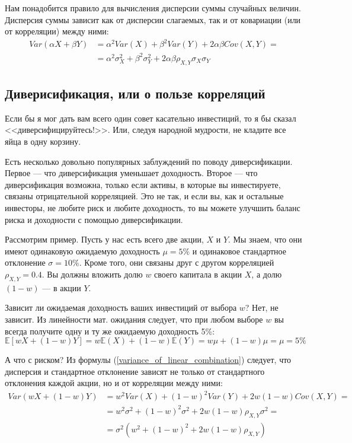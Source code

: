 Нам понадобится правило для вычисления дисперсии суммы случайных величин. Дисперсия суммы зависит как от дисперсии слагаемых, так и от ковариации (или от корреляции) между ними:
\begin{align}
Var(\alpha X + \beta Y) &= \alpha^2 Var(X) + \beta^2 Var(Y) + 2 \alpha \beta Cov(X, Y) = \nonumber \\
&= \alpha^2\sigma_X^2 + \beta^2 \sigma_Y^2 + 2\alpha\beta\rho_{X,Y}\sigma_X\sigma_Y
\label{variance_of_linear_combination}
\end{align}

\subsection{Диверисификация, или о пользе корреляций}

Если бы я мог дать вам всего один совет касательно инвестиций, то я бы сказал <<диверсифицируйтесь!>>. Или, следуя народной мудрости, не кладите все яйца в одну корзину. 

Есть несколько довольно популярных заблуждений по поводу диверсификации. Первое --- что диверсификация уменьшает доходность. Второе --- что диверсификация возможна, только если активы, в которые вы инвестируете, связаны отрицательной корреляцией. Это не так, и если вы, как и остальные инвесторы, не любите риск и любите доходность, то вы можете улучшить баланс риска и доходности с помощью диверсификации.

Рассмотрим пример. Пусть у нас есть всего две акции, $X$ и $Y$. Мы знаем, что они имеют одинаковую ожидаемую доходность $\mu=5\%$ и одинаковое стандартное отклонение $\sigma=10\%$. Кроме того, они связаны друг с другом корреляцией  $\rho_{X,Y} = 0.4$. Вы должны вложить долю $w$ своего капитала в акции $X$, а долю $(1-w)$ --- в акции $Y$.

Зависит ли ожидаемая доходность ваших инвестиций от выбора $w$? Нет, не зависит. Из линейности мат. ожидания следует, что при любом выборе $w$ вы всегда получите одну и ту же ожидаемую доходность 5\%:
\begin{equation*}
\mathbb{E}\left[ wX + (1-w)Y\right] = w\mathbb{E}(X) + (1-w)\mathbb{E}(Y) = w\mu + (1-w)\mu = \mu = 5\%
\end{equation*}

А что с риском? Из формулы (\ref{variance_of_linear_combination}) следует, что дисперсия и стандартное отклонение зависят не только от стандартного отклонения каждой акции, но и от корреляции между ними:
\begin{align*}
Var(wX + (1-w)Y)
&= w^2Var(X) + (1-w)^2Var(Y) + 2w(1-w)Cov(X,Y) = \\
&= w^2\sigma^2 + (1-w)^2\sigma^2 + 2w(1-w)\rho_{X,Y}\sigma^2 = \\
&= \sigma^2\left(w^2 + (1-w)^2 + 2w(1-w)\rho_{X,Y} \right)
\end{align*}

